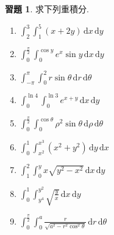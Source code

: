 \documentclass[12pt]{extarticle}
\newcommand{\ds}{\displaystyle}
\theoremstyle{definition}
\newtheorem*{exe}{習題}
\begin{document}
\begin{exe}
  求下列重積分. 
  \begin{multicols}{3}
    \begin{enumerate}\setlength{\itemsep}{0pt}
      \item $\ds\int_2^3\!\int_1^5\!(x + 2y)\,\text{d}x\,\text{d}y$
      \item $\ds\int_0^{\frac{\pi}{2}}\!\int_0^{\cos y}\!e^x\sin y\,\text{d}x\,\text{d}y$
      \item $\ds\int_{-\pi}^{\pi}\!\int_0^2 r\sin\theta\,\text{d}r\,\text{d}\theta$
      \item $\ds\int_0^{\ln 4}\!\!\int_0^{\ln 3}\!\!e^{x + y}\,\text{d}x\,\text{d}y$
      \item $\ds\int_0^{\frac{\pi}{2}}\!\int_0^{\cos\theta}\!\!\rho^2\sin\theta\,\text{d}\rho\,\text{d}\theta$
      \item $\ds\int_0^1\!\int_{x^2}^{x^3}\!(x^2 + y^2)\,\text{d}y\,\text{d}x$
      \item $\ds\int_1^2\!\int_0^y\!x\sqrt{y^2 - x^2}\,\text{d}x\,\text{d}y$
      \item $\ds\int_0^1\!\int_{y^4}^{y^2}\!\!\sqrt{\frac{y}{x}}\,\text{d}x\,\text{d}y$
      \item $\ds\int_0^{\frac{\pi}{2}}\!\!\int_0^a\!\frac{r}{\sqrt{a^2 - r^2\cos^2\theta}}\,\text{d}r\,\text{d}\theta$  
    \end{enumerate}
  \end{multicols}
\end{exe}
\end{document}

